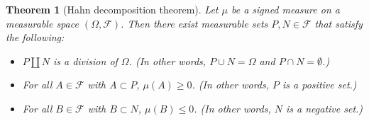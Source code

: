 \documentclass{article}
\numberwithin{equation}{section}
\theoremstyle{plain}
\newtheorem{theorem}{Theorem}[section]
\theoremstyle{definition}
\begin{document}
\begin{theorem}[Hahn decomposition theorem]\label{thm:1.54} Let $\mu$ be a signed measure on a measurable space $(\Omega,\mathscr{F})$. Then there exist measurable sets $P,N\in\mathscr{F}$ that satisfy the following:
\begin{itemize}
	\item[(i)] $P\amalg N$ is a division of $\Omega$. (In other words, $P\cup N=\Omega$ and $P\cap N=\emptyset$.)
	\item[(ii)] For all $A\in\mathscr{F}$ with $A\subset P$, $\mu(A)\geq 0$. (In other words, $P$ is a positive set.)
	\item[(iii)] For all $B\in\mathscr{F}$ with $B\subset N$, $\mu(B)\leq 0$. (In other words, $N$ is a negative set.)
\end{itemize}
\end{theorem}
\end{document}
